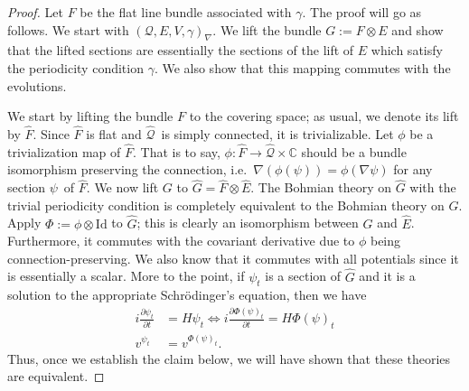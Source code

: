 \documentclass[11pt]{article}
\theoremstyle{remark}
\begin{document}
\begin{proof}
Let $F$ be the flat line bundle associated with \ensuremath{\gamma}. 
The proof will go as follows. We start with $(\ensuremath{\mathcal{Q}}, E, V,
\ensuremath{\gamma})_{\nabla}$. We 
lift the bundle $G \ensuremath{:=} F\otimes E$ and show that the lifted sections are
essentially the sections of the lift of $E$ which satisfy the
periodicity condition \ensuremath{\gamma}. We also show that this mapping commutes
with 
the evolutions. 


We start by lifting the bundle $F$ to
the covering 
space; as usual, we denote its lift by $\ensuremath{\widehat{F}}$. 
Since $\ensuremath{\widehat{F}}$ is flat and \ensuremath{\widehat{\ensuremath{\mathcal{Q}}}}\ is simply connected, 
it is trivializable. Let $\phi$ be a trivialization map of
$\ensuremath{\widehat{F}}$. That is to say, $\phi: \ensuremath{\widehat{F}} \to \ensuremath{\widehat{\ensuremath{\mathcal{Q}}}} \times \ensuremath{\mathbb{C}}$
should be a bundle isomorphism preserving the connection, i.e.\
$\nabla(\phi( \ensuremath{\psi})) = \phi( \nabla\ensuremath{\psi})$ for any section \ensuremath{\psi}\ of $\ensuremath{\widehat{F}}$.  
We now lift $G$ to $\ensuremath{\widehat{G}} =\ensuremath{\widehat{F}} \otimes\ensuremath{\widehat{E}}$. 
The Bohmian theory on $\ensuremath{\widehat{G}}$ with the trivial periodicity
condition is completely equivalent to the Bohmian theory on $G$. 
Apply $\Phi \ensuremath{:=} \phi \otimes \text{Id}$ to $\ensuremath{\widehat{G}}$; this is
clearly an isomorphism between $\ensuremath{\widehat{G}}$ and $\ensuremath{\widehat{E}}$. Furthermore, it
commutes with the covariant derivative due to $\phi$ being
connection-preserving. We also know that it commutes with 
 all potentials since it is essentially a scalar.  
More to the point, if $\ensuremath{\psi}_t$ is a section of
$\ensuremath{\widehat{G}}$ and it is a solution to the appropriate
Schr\"odinger's equation, then we have
\begin{align}
i\ensuremath{\frac{\partial {\ensuremath{\psi}_t}}{\partial {t}}} &= H \ensuremath{\psi}_t  \Leftrightarrow i\ensuremath{\frac{\partial {\Phi(\ensuremath{\psi})_t}}{\partial {t}}} = H
\Phi(\ensuremath{\psi})_t  \\
v^{\ensuremath{\psi}_t} &= v^{\Phi(\ensuremath{\psi})_t}.
\end{align}
Thus, once we establish the claim below, we will have shown that these
theories are equivalent.


\end{proof}
\end{document}
